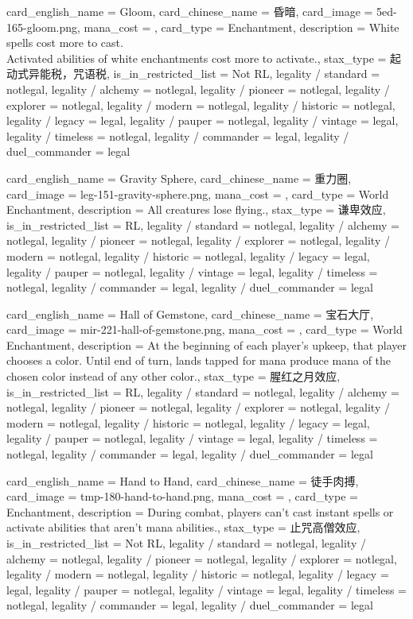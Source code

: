 \documentclass[lang = cn, color = black, 10pt]{AllThatStax}
\begin{document}
\card
{
	card_english_name = {Gloom},
	card_chinese_name = {昏暗},
	card_image = 5ed-165-gloom.png,
	mana_cost = ,
	card_type = Enchantment,
	description = {White spells cost  more to cast.\\
		Activated abilities of white enchantments cost  more to activate.},
	stax_type = 起动式异能税，咒语税,
	is_in_restricted_list = Not RL,
	legality / standard = notlegal,
	legality / alchemy = notlegal,
	legality / pioneer = notlegal,
	legality / explorer = notlegal,
	legality / modern = notlegal,
	legality / historic = notlegal,
	legality / legacy = legal,
	legality / pauper = notlegal,
	legality / vintage = legal,
	legality / timeless = notlegal,
	legality / commander = legal,
	legality / duel_commander = legal
}

\card
{
	card_english_name = {Gravity Sphere},
	card_chinese_name = {重力圈},
	card_image = leg-151-gravity-sphere.png,
	mana_cost = ,
	card_type = World Enchantment,
	description = {All creatures lose flying.},
	stax_type = 谦卑效应,
	is_in_restricted_list = RL,
	legality / standard = notlegal,
	legality / alchemy = notlegal,
	legality / pioneer = notlegal,
	legality / explorer = notlegal,
	legality / modern = notlegal,
	legality / historic = notlegal,
	legality / legacy = legal,
	legality / pauper = notlegal,
	legality / vintage = legal,
	legality / timeless = notlegal,
	legality / commander = legal,
	legality / duel_commander = legal
}

\card
{
	card_english_name = {Hall of Gemstone},
	card_chinese_name = {宝石大厅},
	card_image = mir-221-hall-of-gemstone.png,
	mana_cost = ,
	card_type = World Enchantment,
	description = {At the beginning of each player's upkeep, that player chooses a color. Until end of turn, lands tapped for mana produce mana of the chosen color instead of any other color.},
	stax_type = 腥红之月效应,
	is_in_restricted_list = RL,
	legality / standard = notlegal,
	legality / alchemy = notlegal,
	legality / pioneer = notlegal,
	legality / explorer = notlegal,
	legality / modern = notlegal,
	legality / historic = notlegal,
	legality / legacy = legal,
	legality / pauper = notlegal,
	legality / vintage = legal,
	legality / timeless = notlegal,
	legality / commander = legal,
	legality / duel_commander = legal
}

\card
{
	card_english_name = {Hand to Hand},
	card_chinese_name = {徒手肉搏},
	card_image = tmp-180-hand-to-hand.png,
	mana_cost = ,
	card_type = Enchantment,
	description = {During combat, players can't cast instant spells or activate abilities that aren't mana abilities.},
	stax_type = 止咒高僧效应,
	is_in_restricted_list = Not RL,
	legality / standard = notlegal,
	legality / alchemy = notlegal,
	legality / pioneer = notlegal,
	legality / explorer = notlegal,
	legality / modern = notlegal,
	legality / historic = notlegal,
	legality / legacy = legal,
	legality / pauper = notlegal,
	legality / vintage = legal,
	legality / timeless = notlegal,
	legality / commander = legal,
	legality / duel_commander = legal
}
\end{document}
